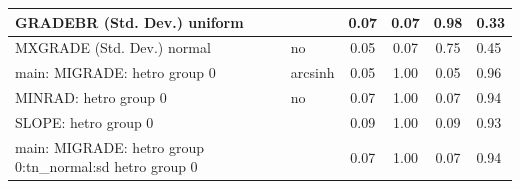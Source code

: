 \begin{table}
\begin{center}
\begin{tabular}{|l|l|c|c|c|l|}
			\hline
			GRADEBR (Std. Dev.) uniform &  & 0.07 & 0.07 & 0.98 & 0.33 \\
			\hline
			MXGRADE (Std. Dev.) normal & no & 0.05 & 0.07 & 0.75 & 0.45 \\
			\hline
			main: MIGRADE: hetro group 0 & arcsinh & 0.05 & 1.00 & 0.05 & 0.96 \\
			\hline
			MINRAD: hetro group 0 & no & 0.07 & 1.00 & 0.07 & 0.94 \\
			\hline
			SLOPE: hetro group 0 &  & 0.09 & 1.00 & 0.09 & 0.93 \\
			\hline
			main: MIGRADE: hetro group 0:tn_normal:sd  hetro group 0 &  & 0.07 & 1.00 & 0.07 & 0.94 \\
			\hline
		\end{tabular}
	\end{center}
\end{table}